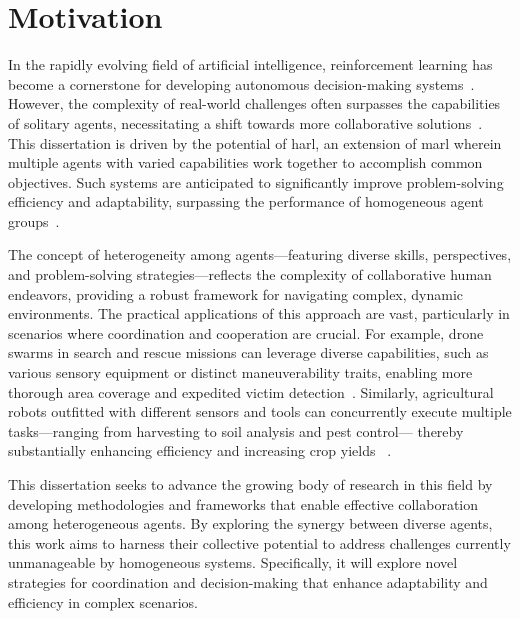 \section{Motivation}%
\label{sec:motivation}

In the rapidly evolving field of artificial intelligence, reinforcement learning has become a 
cornerstone for developing autonomous decision-making systems~\cite{sutton2018}.
However, the complexity of real-world challenges often surpasses the capabilities of solitary agents,
necessitating a shift towards more collaborative solutions~\cite{cao2012}.
This dissertation is driven by the potential of \gls{harl}, an extension of \gls{marl}
wherein multiple agents with varied capabilities work together to accomplish common objectives. 
Such systems are anticipated to significantly improve problem-solving efficiency and adaptability, 
surpassing the performance of homogeneous agent groups~\cite{calvo2018}.

The concept of heterogeneity among agents—featuring diverse skills, perspectives, 
and problem-solving strategies—reflects the complexity of collaborative human endeavors, 
providing a robust framework for navigating complex, dynamic environments. 
The practical applications of this approach are vast, 
particularly in scenarios where coordination and cooperation are crucial. 
For example, drone swarms in search and rescue missions can leverage diverse capabilities, 
such as various sensory equipment or distinct maneuverability traits, 
enabling more thorough area coverage and expedited victim detection~\cite{hoang2023,kouzeghar2023}.
Similarly, agricultural robots outfitted with different sensors and tools can concurrently 
execute multiple tasks—ranging from harvesting to soil analysis and pest control—
thereby substantially enhancing efficiency and increasing crop yields~%
\cite{carbone2018,amarasinghe2019}.

This dissertation seeks to advance the growing body of research in this field by developing 
methodologies and frameworks that enable effective collaboration among heterogeneous agents. 
By exploring the synergy between diverse agents, this work aims to harness their collective 
potential to address challenges currently unmanageable by homogeneous systems. 
Specifically, it will explore novel strategies for coordination and decision-making 
that enhance adaptability and efficiency in complex scenarios.


